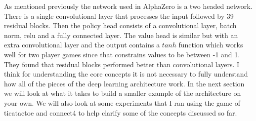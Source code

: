    As mentioned previously the network used in AlphaZero is a two headed network. There is a single convolutional layer that processes the input followed by 39 residual blocks. Then the policy head consists of a convolutional layer, batch norm, relu and a fully connected layer. The value head is similar but with an extra convolutional layer and the output contains a $tanh$ function which works well for two player games since that constrains values to be between -1 and 1. They found that residual blocks performed better than convolutional layers. I think for understanding the core concepts it is not necessary to fully understand how all of the pieces of the deep learning architecture work. In the next section we will look at what it takes to build a smaller example of the architecture on your own. We will also look at some experiments that I ran using the game of ticatactoe and connect4 to help clarify some of the concepts discussed so far. 
    
